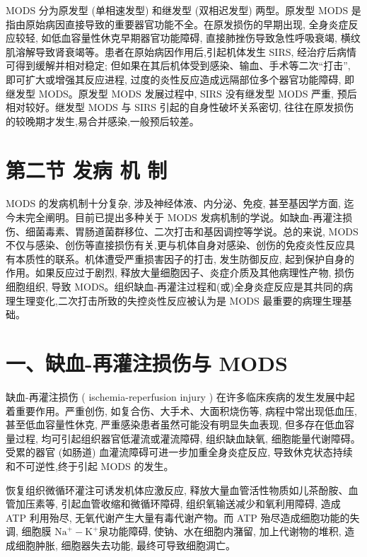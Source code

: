 \documentclass[10pt]{article}
\begin{document}
MODS 分为原发型 (单相速发型) 和继发型 (双相迟发型) 两型。原发型 MODS 是指由原始病因直接导致的重要器官功能不全。在原发损伤的早期出现, 全身炎症反应较轻, 如低血容量性休克早期器官功能障碍, 直接肺挫伤导致急性呼吸衰竭, 横纹肌溶解导致肾衰竭等。患者在原始病因作用后,引起机体发生 SIRS, 经治疗后病情可得到缓解并相对稳定; 但如果在其后机体受到感染、输血、手术等二次“打击”, 即可扩大或增强其反应进程, 过度的炎性反应造成远隔部位多个器官功能障碍, 即继发型 MODS。原发型 MODS 发展过程中, SIRS 没有继发型 MODS 严重, 预后相对较好。继发型 MODS 与 SIRS 引起的自身性破坏关系密切, 往往在原发损伤的较晚期才发生,易合并感染,一般预后较差。

\section*{第二节 发病 机 制}
MODS 的发病机制十分复杂, 涉及神经体液、内分泌、免疫, 甚至基因学方面, 迄今未完全阐明。目前已提出多种关于 MODS 发病机制的学说。如缺血-再灌注损伤、细菌毒素、胃肠道菌群移位、二次打击和基因调控等学说。总的来说, MODS 不仅与感染、创伤等直接损伤有关,更与机体自身对感染、创伤的免疫炎性反应具有本质性的联系。机体遭受严重损害因子的打击, 发生防御反应, 起到保护自身的作用。如果反应过于剧烈, 释放大量细胞因子、炎症介质及其他病理性产物, 损伤细胞组织, 导致 MODS。组织缺血-再灌注过程和(或)全身炎症反应是其共同的病理生理变化,二次打击所致的失控炎性反应被认为是 MODS 最重要的病理生理基础。

\section*{一、缺血-再灌注损伤与 MODS}
缺血-再灌注损伤 ( ischemia-reperfusion injury ) 在许多临床疾病的发生发展中起着重要作用。严重创伤, 如复合伤、大手术、大面积烧伤等, 病程中常出现低血压, 甚至低血容量性休克, 严重感染患者虽然可能没有明显失血表现, 但多存在低血容量过程, 均可引起组织器官低灌流或灌流障碍, 组织缺血缺氧, 细胞能量代谢障碍。受累的器官 (如肠道) 血灌流障碍可进一步加重全身炎症反应, 导致休克状态持续和不可逆性,终于引起 MODS 的发生。

恢复组织微循环灌注可诱发机体应激反应, 释放大量血管活性物质如儿茶酚胺、血管加压素等, 引起血管收缩和微循环障碍, 组织氧输送减少和氧利用障碍, 造成 ATP 利用殆尽, 无氧代谢产生大量有毒代谢产物。而 ATP 殆尽造成细胞功能的失调, 细胞膜 $\mathrm{Na}^{+}-\mathrm{K}^{+}$泉功能障碍, 使钠、水在细胞内潴留, 加上代谢物的堆积, 造成细胞肿胀, 细胞器失去功能, 最终可导致细胞淍亡。
\end{document}
